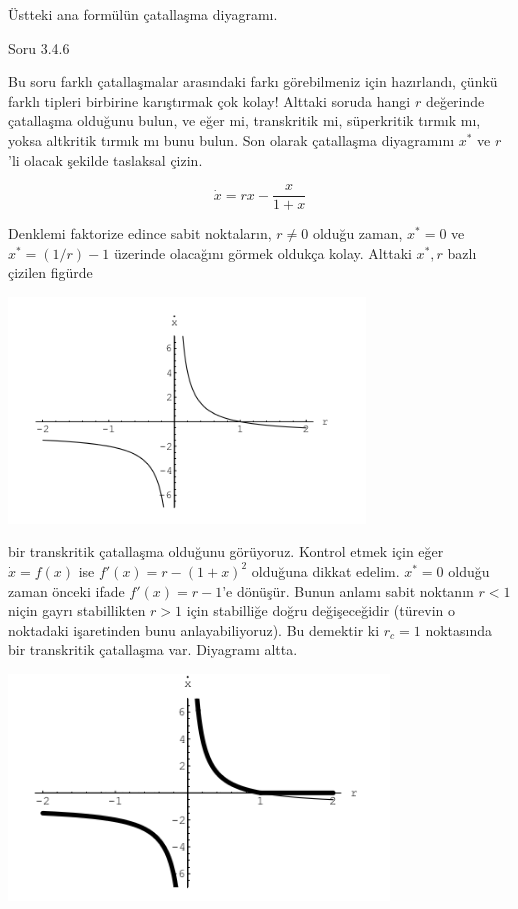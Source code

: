 \documentclass[12pt,fleqn]{article}\usepackage{../../common}
\begin{document}
Üstteki ana formülün çatallaşma diyagramı.

Soru 3.4.6

Bu soru farklı çatallaşmalar arasındaki farkı görebilmeniz için hazırlandı,
çünkü farklı tipleri birbirine karıştırmak çok kolay! Alttaki soruda hangi $r$
değerinde çatallaşma olduğunu bulun, ve eğer mi, transkritik mi, süperkritik
tırmık mı, yoksa altkritik tırmık mı bunu bulun. Son olarak çatallaşma
diyagramını $x^\ast$ ve $r$'li olacak şekilde taslaksal çizin.

$$ \dot{x} = rx - \frac{x}{1+x} $$

Denklemi faktorize edince sabit noktaların, $r \ne 0$ olduğu zaman, $x^\ast=0$ ve
$x^\ast=(1/r)-1$ üzerinde olacağını görmek oldukça kolay. Alttaki $x^\ast,r$ bazlı
çizilen figürde

\includegraphics[height=6cm]{08_04.png}

bir transkritik çatallaşma olduğunu görüyoruz. Kontrol etmek için eğer
$\dot{x}=f(x)$ ise $f'(x) = r - (1+x)^2$ olduğuna dikkat edelim. $x^\ast=0$ olduğu
zaman önceki ifade $f'(x) = r-1$'e dönüşür. Bunun anlamı sabit noktanın $r<1$
niçin gayrı stabillikten $r>1$ için stabilliğe doğru değişeceğidir (türevin o
noktadaki işaretinden bunu anlayabiliyoruz). Bu demektir ki $r_c = 1$ noktasında
bir transkritik çatallaşma var. Diyagramı altta.

\includegraphics[height=6cm]{08_05.png}
\end{document}
